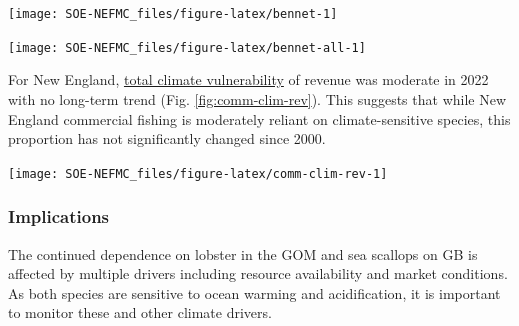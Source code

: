 \documentclass[
  10pt,
]{article}
\let\origfigure\figure
\let\endorigfigure\endfigure
\renewenvironment{figure}[1][2] {
    \expandafter\origfigure\expandafter[H]
} {
    \endorigfigure
}
\begin{document}
\begin{figure}

{\centering \texttt{[image: SOE-NEFMC\_files/figure-latex/bennet-1]} 

}

\caption{Revenue change from the 1982 baseline in 2023 dollars (black), price, and volume for commercial landings from Georges Bank (GB: left) and the Gulf of Maine (GOM: right)}\label{fig:bennet}
\end{figure}
\begin{figure}

{\centering \texttt{[image: SOE-NEFMC\_files/figure-latex/bennet-all-1]} 

}

\caption{Revenue change from the long-term mean in 2023 dollars (black), price, and volume for commercial landings from Georges Bank (GB: top panels) and the Gulf of Maine (GOM: bottom panels)}\label{fig:bennet-all}
\end{figure}

For New England, \href{https://noaa-edab.github.io/catalog/community_climate_vulnerability.html}{total climate vulnerability} of revenue was moderate in 2022 with no long-term trend (Fig. \ref{fig:comm-clim-rev}). This suggests that while New England commercial fishing is moderately reliant on climate-sensitive species, this proportion has not significantly changed since 2000.

\begin{figure}

{\centering \texttt{[image: SOE-NEFMC\_files/figure-latex/comm-clim-rev-1]} 

}

\caption{Total climate vulnerability on New England revenue from 2000 to 2022. Horizontal colored bars show different climate risk levels.}\label{fig:comm-clim-rev}
\end{figure}

\hypertarget{implications-1}{%
\subsubsection{Implications}\label{implications-1}}

The continued dependence on lobster in the GOM and sea scallops on GB is affected by multiple drivers including resource availability and market conditions. As both species are sensitive to ocean warming and acidification, it is important to monitor these and other climate drivers.
\end{document}
